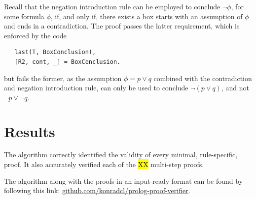 \documentclass[a4paper, 11pt]{article}
\begin{document}
   Recall that the negation introduction rule can be employed
   to conclude $\neg \phi$, for some formula $\phi$, if, and 
   only if, there exists a box starts with an assumption of
   $\phi$ and ends in a contradiction. The proof passes the
   latter requirement, which is enforced by the code

\begin{verbatim}
   last(T, BoxConclusion),
   [R2, cont, _] = BoxConclusion.
\end{verbatim}

   but fails the former, as the assumption $\phi = p \vee q$
   combined with the contradiction and negation introduction 
   rule, can only be used to conclude $\neg (p \vee q)$, and
   not $\neg p \vee \neg q$.

   \section{Results}
   The algorithm correctly identified the validity of every
   minimal, rule-specific, proof. It also accurately verified
   each of the \hl{XX} multi-step proofs.
   \bigbreak

   The algorithm along with the proofs in an input-ready
   format can be found by following this link: 
   \url{github.com/konradcl/prolog-proof-verifier}.
\end{document}
